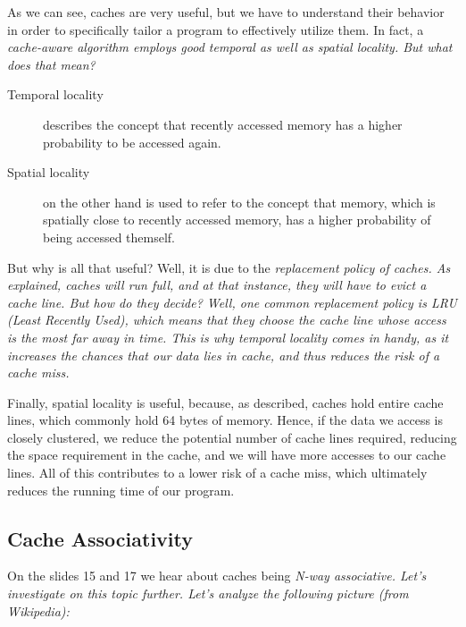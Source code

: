 \documentclass[../../main.tex]{subfiles}
\begin{document}
As we can see, caches are very useful, but we have to understand their behavior in order to specifically tailor a program to effectively utilize them. In fact, a \em cache-aware \em algorithm employs good temporal as well as spatial locality. But what does that mean?

\begin{description}
    \item[Temporal locality] describes the concept that recently accessed memory has a higher probability to be accessed again.
    \item[Spatial locality] on the other hand is used to refer to the concept that memory, which is spatially close to recently accessed memory, has a higher probability of being accessed themself.
\end{description}

But why is all that useful? Well, it is due to the \em replacement policy \em of caches. As explained, caches will run full, and at that instance, they will have to evict a cache line. But how do they decide? Well, one common replacement policy is \em LRU (Least Recently Used)\em , which means that they choose the cache line whose access is the most far away in time. This is why temporal locality comes in handy, as it increases the chances that our data lies in cache, and thus reduces the risk of a cache miss.

Finally, spatial locality is useful, because, as described, caches hold entire cache lines, which commonly hold 64 bytes of memory. Hence, if the data we access is closely clustered, we reduce the potential number of cache lines required, reducing the space requirement in the cache, and we will have more accesses to our cache lines. All of this contributes to a lower risk of a cache miss, which ultimately reduces the running time of our program.

\bigskip
\subsection{Cache Associativity}
On the slides 15 and 17 we hear about caches being \em N-way associative\em . Let's investigate on this topic further. Let's analyze the following picture (from Wikipedia):
\end{document}
